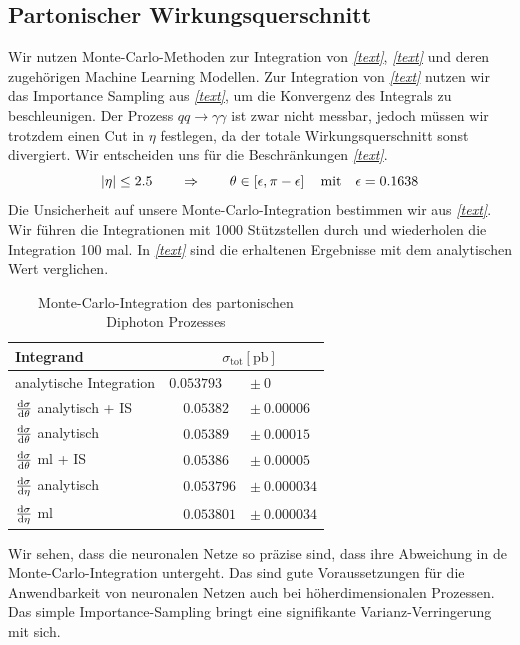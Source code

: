\subsection{Partonischer Wirkungsquerschnitt}
Wir nutzen Monte-Carlo-Methoden zur Integration von \textit{\autoref{text}}, \textit{\autoref{text}} und deren zugehörigen Machine Learning Modellen. Zur Integration von \textit{\autoref{text}} nutzen wir das Importance Sampling aus \textit{\autoref{text}}, um die Konvergenz des Integrals zu beschleunigen. Der Prozess $qq \rightarrow \gamma \gamma$ ist zwar nicht messbar, jedoch müssen wir trotzdem einen Cut in $\eta$ festlegen, da der totale Wirkungsquerschnitt sonst divergiert. Wir entscheiden uns für die Beschränkungen \textit{\autoref{text}}.
\begin{equation}
	\abs{\eta} \leq 2.5 \qquad \Rightarrow \qquad \theta \in \left[\epsilon, \pi - \epsilon \right] \quad \text{mit} \quad \epsilon = 0.1638
\end{equation}
Die Unsicherheit auf unsere Monte-Carlo-Integration bestimmen wir aus \textit{\autoref{text}}. Wir führen die Integrationen mit 1000 Stützstellen durch und wiederholen die Integration 100 mal. In \textit{\autoref{text}} sind die erhaltenen Ergebnisse mit dem analytischen Wert verglichen.
\begin{table}
	\centering
	\begin{tabular}{lll}
		Integrand & \multicolumn{2}{c}{$\quad \sigma_{\text{tot}}[\text{pb}]$} \\
		\hline
		analytische Integration& \quad  $0.053793$ &$\pm~ 0$\\
		$\derivative{\sigma}{\theta}$ analytisch + IS & $\quad 0.05382 $&$\pm~ 0.00006 $ \\
		$\derivative{\sigma}{\theta}$ analytisch & $\quad 0.05389$ &$\pm~ 0.00015 $ \\
		$\derivative{\sigma}{\theta}$ ml + IS &$\quad 0.05386$ &$\pm~ 0.00005$ \\
		$\derivative{\sigma}{\eta}$ analytisch & $\quad 0.053796 $&$\pm~ 0.000034$ \\
		$\derivative{\sigma}{\eta}$ ml & $\quad 0.053801 $&$\pm~ 0.000034$ \\
	\end{tabular}
	\caption{Monte-Carlo-Integration des partonischen Diphoton Prozesses}
\end{table}
Wir sehen, dass die neuronalen Netze so präzise sind, dass ihre Abweichung in de Monte-Carlo-Integration untergeht. Das sind gute Voraussetzungen für die Anwendbarkeit von neuronalen Netzen auch bei höherdimensionalen Prozessen. Das simple Importance-Sampling bringt eine signifikante Varianz-Verringerung mit sich.
